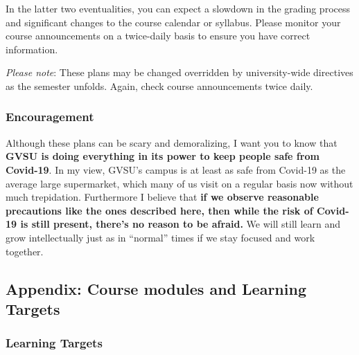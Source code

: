 \documentclass[]{article}
\begin{document}
In the latter two eventualities, you can expect a slowdown in the
grading process and significant changes to the course calendar or
syllabus. Please monitor your course announcements on a twice-daily
basis to ensure you have correct information.

\emph{Please note}: These plans may be changed overridden by
university-wide directives as the semester unfolds. Again, check course
announcements twice daily.

\hypertarget{encouragement}{%
\subsubsection{Encouragement}\label{encouragement}}

Although these plans can be scary and demoralizing, I want you to know
that \textbf{GVSU is doing everything in its power to keep people safe
from Covid-19}. In my view, GVSU's campus is at least as safe from
Covid-19 as the average large supermarket, which many of us visit on a
regular basis now without much trepidation. Furthermore I believe that
\textbf{if we observe reasonable precautions like the ones described
here, then while the risk of Covid-19 is still present, there's no
reason to be afraid.} We will still learn and grow intellectually just
as in ``normal'' times if we stay focused and work together.

\hypertarget{appendix-course-modules-and-learning-targets}{%
\subsection{Appendix: Course modules and Learning
Targets}\label{appendix-course-modules-and-learning-targets}}

\hypertarget{learning-targets}{%
\subsubsection{Learning Targets}\label{learning-targets}}
\end{document}
